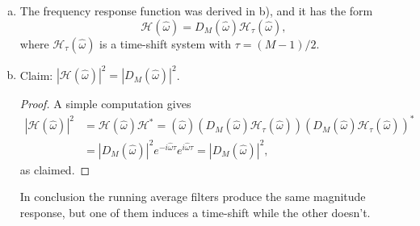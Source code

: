 \begin{enumerate}
\begin{enumerate}[a)]
\item The frequency response function was derived in b), and it has the form 
$$\mathcal{H}(\hat{\omega})=D_{M}(\hat{\omega})\mathcal{H}_{\tau}(\hat{\omega}),$$
where $\mathcal{H}_{\tau}(\hat{\omega})$ is a time-shift system with $\tau=(M-1)/2$. 

\item Claim: $|\mathcal{H}(\hat{\omega})|^{2}=|D_{M}(\hat{\omega})|^{2}$.
\begin{proof}
A simple computation gives
\begin{align*}
    |\mathcal{H}(\hat{\omega})|^{2}&=\mathcal{H}(\hat{\omega})\mathcal{H}^{*}=(\hat{\omega})(D_{M}(\hat{\omega})\mathcal{H}_{\tau}(\hat{\omega}))(D_{M}(\hat{\omega})\mathcal{H}_{\tau}(\hat{\omega}))^{*}\\
    &=|D_{M}(\hat{\omega})|^{2}e^{-i\hat{\omega}\tau}e^{i\hat{\omega}\tau}=|D_{M}(\hat{\omega})|^{2},
\end{align*}
as claimed. 
\end{proof}
In conclusion the running average filters produce the same magnitude response, but one of them induces a time-shift while the other doesn't. 
\end{enumerate}



\end{enumerate}


